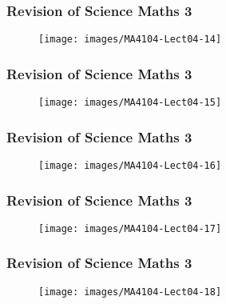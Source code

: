 \documentclass{beamer}
\begin{document}
	\begin{frame}
		\frametitle{Revision of Science Maths 3}
		\begin{figure}
			\centering
			\texttt{[image: images/MA4104-Lect04-14]}
			
		\end{figure}
	\end{frame}
	\begin{frame}
		\frametitle{Revision of Science Maths 3}
		\begin{figure}
			\centering
			\texttt{[image: images/MA4104-Lect04-15]}
			
		\end{figure}
	\end{frame}
	\begin{frame}
		\frametitle{Revision of Science Maths 3}
		\begin{figure}
			\centering
			\texttt{[image: images/MA4104-Lect04-16]}
			
		\end{figure}
	\end{frame}
	\begin{frame}
		\frametitle{Revision of Science Maths 3}
		\begin{figure}
			\centering	
			\texttt{[image: images/MA4104-Lect04-17]}
			
		\end{figure}
	\end{frame}
	\begin{frame}
		\frametitle{Revision of Science Maths 3}
		\begin{figure}
			\centering
			\texttt{[image: images/MA4104-Lect04-18]}
			
		\end{figure}
	\end{frame}
	
\end{document}
